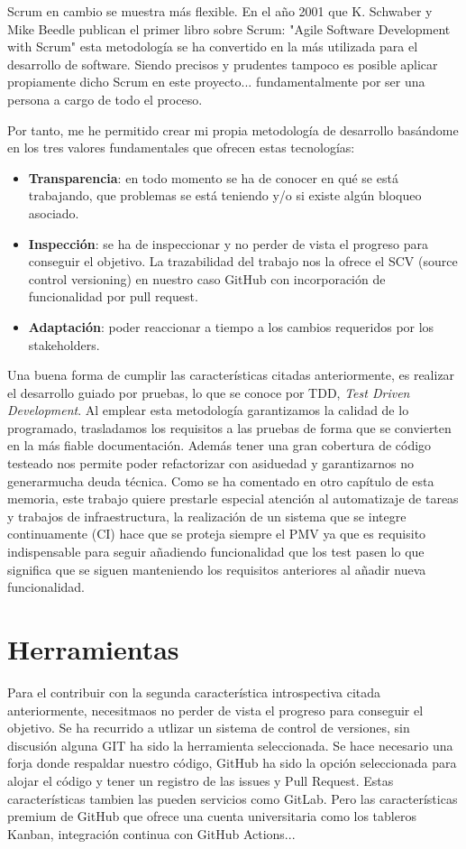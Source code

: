 Scrum en cambio se muestra más flexible. En el año 2001 que K. Schwaber y Mike Beedle publican el
primer libro sobre Scrum\cite{agile_book}: "Agile Software Development with Scrum" esta metodología se ha convertido en la
más utilizada para el desarrollo de software. Siendo precisos y prudentes tampoco es posible aplicar 
propiamente dicho Scrum en este proyecto... fundamentalmente por ser una persona a cargo de todo el proceso.

Por tanto, me he permitido crear mi propia metodología de desarrollo basándome en los tres valores fundamentales 
que ofrecen estas tecnologías:
\begin{itemize}
    \item \textbf{Transparencia}: en todo momento se ha de conocer en qué se está trabajando, que problemas se está teniendo y/o si 
    existe algún bloqueo asociado.
    \item \textbf{Inspección}: se ha de inspeccionar y no perder de vista el progreso para conseguir el objetivo. La 
    trazabilidad del trabajo nos la ofrece el SCV (source control versioning) en nuestro caso GitHub con incorporación
    de funcionalidad por pull request.
    \item \textbf{Adaptación}: poder reaccionar a tiempo a los cambios requeridos por los stakeholders.
\end{itemize}

Una buena forma de cumplir las características citadas anteriormente, es realizar el desarrollo guiado por pruebas, 
lo que se conoce por TDD, \textit{Test Driven Development}. Al emplear esta metodología garantizamos la calidad 
de lo programado, trasladamos los requisitos a las pruebas de forma que se convierten en la más fiable documentación.
Además tener una gran cobertura de código testeado nos permite poder refactorizar con asiduedad y garantizarnos 
no generarmucha deuda técnica.
Como se ha comentado en otro capítulo de esta memoria, este trabajo quiere prestarle especial atención al 
automatizaje de tareas y trabajos de infraestructura, la realización de un sistema que se integre continuamente 
(CI) hace que se proteja siempre el PMV ya que es requisito indispensable para seguir añadiendo funcionalidad 
que los test pasen lo que significa que se siguen manteniendo los requisitos anteriores al añadir nueva 
funcionalidad.

\section{Herramientas}
Para el contribuir con la segunda característica introspectiva citada anteriormente, necesitmaos no perder 
de vista el progreso para conseguir el objetivo. Se ha recurrido a utlizar un sistema de control de versiones, 
sin discusión alguna GIT ha sido la herramienta seleccionada. Se hace necesario una forja donde respaldar nuestro 
código, GitHub ha sido la opción seleccionada para alojar el código y tener un registro de las issues y Pull Request. Estas
características tambien las pueden servicios como GitLab. Pero las características premium de GitHub que ofrece una cuenta
universitaria como los tableros Kanban, integración continua con GitHub Actions...

